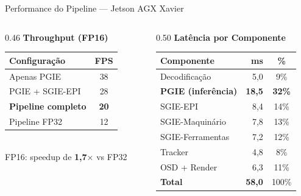 \begin{frame}{Performance do Pipeline --- Jetson AGX Xavier}
  \vspace{-2mm}
  \begin{columns}[c]
    \begin{column}{0.46\textwidth}
      \centering
      {\normalsize\textbf{Throughput (FP16)}}\\[3pt]
      \renewcommand{\arraystretch}{1.3}
      \begin{tabular}{@{}lc@{}}
        \toprule
        \textbf{Configuração} & \textbf{FPS} \\
        \midrule
        Apenas PGIE & 38 \\
        PGIE + SGIE-EPI & 28 \\
        \rowcolor{headcolor!15}
        \textbf{Pipeline completo} & \textcolor{headcolor}{\fontsize{14}{16}\selectfont\textbf{20}} \\
        \midrule
        {\scriptsize Pipeline FP32} & {\scriptsize 12} \\
        \bottomrule
      \end{tabular}\\[4pt]
      {\scriptsize\textcolor{arrowcolor}{FP16: speedup de \textbf{1,7$\times$} vs FP32}}
    \end{column}
    \begin{column}{0.50\textwidth}
      \centering
      \vspace{2mm}
      {\small\textbf{Lat\^{e}ncia por Componente}}\\[2pt]
      \renewcommand{\arraystretch}{1.05}
      \scriptsize
      \begin{tabular}{@{}lrc@{}}
        \toprule
        \textbf{Componente} & \textbf{ms} & \textbf{\%} \\
        \midrule
        Decodifica\c{c}\~{a}o & 5,0 & 9\% \\
        \rowcolor{skipcolor!12}
        \textbf{PGIE (infer\^{e}ncia)} & \textcolor{skipcolor}{\textbf{18,5}} & \textcolor{skipcolor}{\textbf{32\%}} \\
        SGIE-EPI & 8,4 & 14\% \\
        SGIE-Maquin\'{a}rio & 7,8 & 13\% \\
        SGIE-Ferramentas & 7,2 & 12\% \\
        Tracker & 4,8 & 8\% \\
        OSD + Render & 6,3 & 11\% \\
        \midrule
        \textbf{Total} & \textbf{58,0} & 100\% \\
        \bottomrule
      \end{tabular}
    \end{column}
  \end{columns}


\end{frame}
